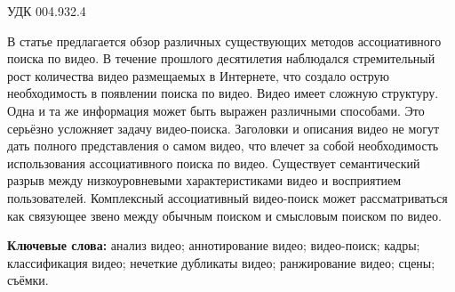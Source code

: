 

\noindent УДК 004.932.4


{\small

В статье предлагается обзор различных существующих методов
ассоциативного поиска по видео.
В течение прошлого десятилетия наблюдался стремительный рост
количества видео размещаемых в Интернете,
что создало острую необходимость в появлении поиска по видео.
Видео имеет сложную структуру. Одна и та же информация
может быть выражен различными способами.
Это серьёзно усложняет задачу видео-поиска.
Заголовки и описания видео не могут
дать полного представления о самом видео,
что влечет за собой необходимость использования
ассоциативного поиска по видео.
Существует семантический разрыв между низкоуровневыми
характеристиками видео и восприятием пользователей.
Комплексный ассоциативный видео-поиск
может рассматриваться как связующее звено между обычным поиском
и смысловым поиском по видео.

{\bf Ключевые слова:}
анализ видео;
аннотирование видео;
видео-поиск;
кадры;
классификация видео;
нечеткие дубликаты видео;
ранжирование видео;
сцены;
съёмки.

}

